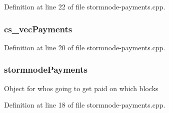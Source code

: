 Definition at line 22 of file stormnode-\/payments.\+cpp.

\hypertarget{stormnode-payments_8h_ad7b9616c84ed22224772799b69d7cbeb}{}
\subsubsection[{cs\+\_\+vec\+Payments}]{ cs\+\_\+vec\+Payments}\label{stormnode-payments_8h_ad7b9616c84ed22224772799b69d7cbeb}


Definition at line 20 of file stormnode-\/payments.\+cpp.

\hypertarget{stormnode-payments_8h_a1d528b1b067a2f669dfd90c513a97116}{}
\subsubsection[{stormnode\+Payments}]{ stormnode\+Payments}\label{stormnode-payments_8h_a1d528b1b067a2f669dfd90c513a97116}
Object for who\textquotesingle{}s going to get paid on which blocks 

Definition at line 18 of file stormnode-\/payments.\+cpp.

